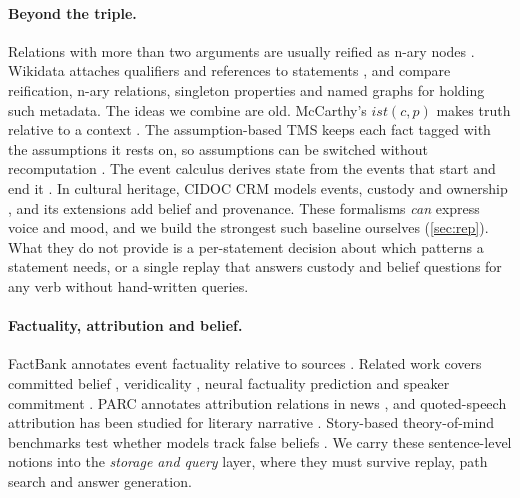 \documentclass[11pt]{article}
\begin{document}
\paragraph{Beyond the triple.} Relations with more than two arguments are usually reified as n-ary nodes \citep{Noy2006NaryRelations}. Wikidata attaches qualifiers and references to statements \citep{Vrandei2014WikidataFree}, and \citet{Hernndez2015ReifyingRdf} compare reification, n-ary relations, singleton properties and named graphs for holding such metadata. The ideas we combine are old. McCarthy's $\mathit{ist}(c,p)$ makes truth relative to a context \citep{Mccarthy1993NotesFormalizing}. The assumption-based TMS keeps each fact tagged with the assumptions it rests on, so assumptions can be switched without recomputation \citep{deKleer1986Atms}. The event calculus derives state from the events that start and end it \citep{Kowalski1986LogicbasedCalculus}. In cultural heritage, CIDOC CRM models events, custody and ownership \citep{Doerr2003Cidoc}, and its extensions add belief and provenance. These formalisms \emph{can} express voice and mood, and we build the strongest such baseline ourselves (\cref{sec:rep}). What they do not provide is a per-statement decision about which patterns a statement needs, or a single replay that answers custody and belief questions for any verb without hand-written queries.

\paragraph{Factuality, attribution and belief.} FactBank annotates event factuality relative to sources \citep{Sauri2009Factbank}. Related work covers committed belief \citep{Diab2009CommittedBelief}, veridicality \citep{Marneffe2012DidIt}, neural factuality prediction \citep{Rudinger2018NeuralModels} and speaker commitment \citep{Jiang2019DoYou}. PARC annotates attribution relations in news \citep{Pareti2016Parc30}, and quoted-speech attribution has been studied for literary narrative \citep{Elson2010AutomaticAttribution}. Story-based theory-of-mind benchmarks test whether models track false beliefs \citep{Nematzadeh2018EvaluatingTheory,Sap2022NeuralTheoryofmind}. We carry these sentence-level notions into the \emph{storage and query} layer, where they must survive replay, path search and answer generation.
\end{document}
